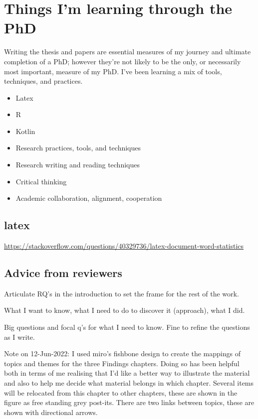 \chapter{Things I'm learning through the PhD}
Writing the thesis and papers are essential measures of my journey and ultimate completion of a PhD; however they're not likely to be the only, or necessarily most important, measure of my PhD. I've been learning a mix of tools, techniques, and practices.

\begin{itemize}
    \item Latex
    \item R
    \item Kotlin
    \item Research practices, tools, and techniques
    \item Research writing and reading techniques
    \item Critical thinking
    \item Academic collaboration, alignment, cooperation
\end{itemize}{}

\section{latex}
\url{https://stackoverflow.com/questions/40329736/latex-document-word-statistics}

\section{Advice from reviewers}


Articulate RQ's in the introduction to set the frame for the rest of the work.

What I want to know, what I need to do to discover it (approach), what I did.

Big questions and focal q's for what I need to know. Fine to refine the questions as I write.

\clearpage

Note on 12-Jun-2022: I used miro's fishbone design to create the mappings of topics and themes for the three Findings chapters. Doing so has been helpful both in terms of me realising that I'd like a better way to illustrate the material and also to help me decide what material belongs in which chapter. Several items will be relocated from this chapter to other chapters, these are shown in the figure as free standing grey post-its. There are two links between topics, these are shown with directional arrows.